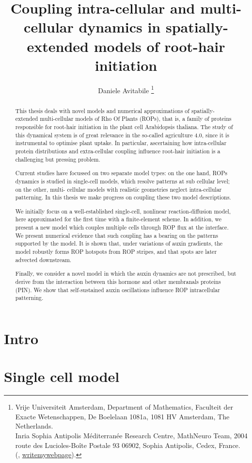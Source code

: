 \documentclass[a4paper]{siamonline220329}
\title{Coupling intra-cellular and multi-cellular dynamics in spatially-extended models of root-hair initiation}
\author{%
  Daniele Avitabile%
  \thanks{%
    Vrije Universiteit Amsterdam,
    Department of Mathematics,
    Faculteit der Exacte Wetenschappen,
    De Boelelaan 1081a,
    1081 HV Amsterdam, The Netherlands.
  \protect\\
    Inria Sophia Antipolis M\'editerran\'ee Research Centre,
    MathNeuro Team,
    2004 route des Lucioles-Boîte Postale 93 06902,
    Sophia Antipolis, Cedex, France.
  \protect\\
    (\email{d.avitabile@vu.nl}, \url{writemywebpage}).
  }
}
\begin{document}
\maketitle

\begin{abstract}
This thesis deals with novel models and numerical approximations of
spatially-extended multi-cellular models of Rho Of Plants (ROPs), that is, a family
of proteins responsible for root-hair initiation in the plant cell Arabidopsis
thaliana. The study of this dynamical system is of great relevance in the so-called
agriculture 4.0, since it is instrumental to optimise plant uptake. In particular,
ascertaining how intra-cellular protein distributions and extra-cellular coupling
influence root-hair initiation is a challenging but pressing problem.

Current studies have focussed on two separate model types: on the one hand, ROPs dynamics is studied in single-cell models, which resolve patterns at sub cellular level; on the other, multi- cellular models with realistic geometries neglect intra-cellular patterning. In this thesis we make progress on coupling these two
model descriptions.

We initially focus on a well-established single-cell, nonlinear reaction-diffusion model, here approximated for the first time with a finite-element scheme. In addition, we present a new model which couples multiple cells through ROP flux at the interface. We present numerical evidence that such coupling has a bearing on the patterns supported by the model. It is shown that, under variations of auxin gradients, the model robustly forms ROP hotspots from ROP stripes, and that spots are later advected downstream.

Finally, we consider a novel model in which the auxin dynamics are not prescribed, but derive from the interaction between this hormone and other membranals proteins (PIN). We show that self-sustained auxin oscillations influence ROP intracellular patterning.
\end{abstract}


\section{Intro}

\section{Single cell model}\label{sec:singleCell} 
\end{document}

